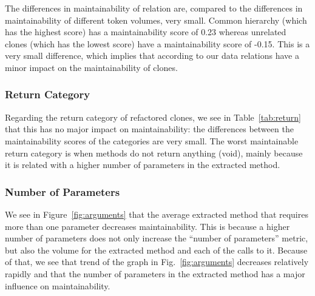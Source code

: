 The differences in maintainability of relation are, compared to the differences in maintainability of different token volumes, very small. Common hierarchy (which has the highest score) has a maintainability score of 0.23 whereas unrelated clones (which has the lowest score) have a maintainability score of -0.15. This is a very small difference, which implies that according to our data relations have a minor impact on the maintainability of clones.

\subsubsection{Return Category}
Regarding the return category of refactored clones, we see in Table~\ref{tab:return} that this has no major impact on maintainability: the differences between the maintainability scores of the categories are very small. The worst maintainable return category is when methods do not return anything (void), mainly because it is related with a higher number of parameters in the extracted method.

\subsubsection{Number of Parameters}
We see in Figure~\ref{fig:arguments} that the average extracted method that requires more than one parameter decreases maintainability. This is because a higher number of parameters does not only increase the ``number of parameters'' metric, but also the volume for the extracted method and each of the calls to it. Because of that, we see that trend of the graph in Fig.~\ref{fig:arguments} decreases relatively rapidly and that the number of parameters in the extracted method has a major influence on maintainability.
